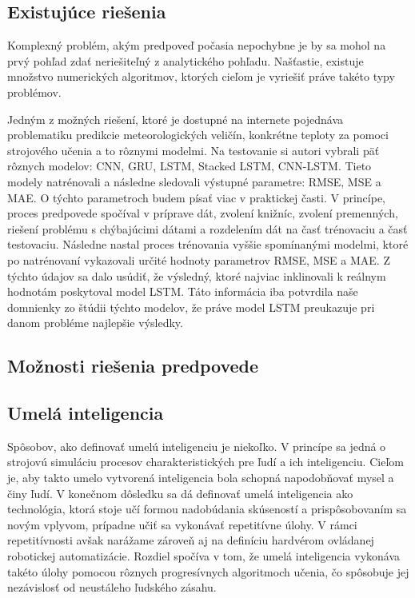 \subsection{Existujúce riešenia}
Komplexný problém, akým predpoveď počasia nepochybne je by sa mohol na prvý pohľad zdať neriešiteľný z analytického pohľadu. Našťastie, existuje množstvo numerických algoritmov, ktorých cieľom je vyriešiť práve takéto typy problémov. 

Jedným z možných riešení, ktoré je dostupné na internete pojednáva problematiku predikcie meteorologických veličín, konkrétne teploty za pomoci strojového učenia a to rôznymi modelmi. Na testovanie si autori vybrali päť rôznych modelov: CNN, GRU, LSTM, Stacked LSTM, CNN-LSTM. Tieto modely natrénovali a následne sledovali výstupné parametre: RMSE, MSE a MAE. O týchto parametroch budem písať viac v praktickej časti. V princípe, proces predpovede spočíval v príprave dát, zvolení knižníc, zvolení premenných, riešení problému s chýbajúcimi dátami a rozdelením dát na časť trénovaciu a časť testovaciu. Následne nastal proces trénovania vyššie spomínanými modelmi, ktoré po natrénovaní vykazovali určité hodnoty parametrov RMSE, MSE a MAE. Z týchto údajov sa dalo usúdiť, že výsledný, ktoré najviac inklinovali k reálnym hodnotám poskytoval model LSTM. Táto informácia iba potvrdila naše domnienky zo štúdii týchto modelov, že práve model LSTM preukazuje pri danom probléme najlepšie výsledky. 

\subsection{Možnosti riešenia predpovede}

\subsection{Umelá inteligencia}
Spôsobov, ako definovať umelú inteligenciu je niekoľko. V princípe sa jedná o strojovú simuláciu procesov charakteristických pre ľudí a ich inteligenciu. Cieľom je, aby takto umelo vytvorená inteligencia bola schopná napodobňovať mysel a činy ľudí. V konečnom dôsledku sa dá definovať umelá inteligencia ako technológia, ktorá stoje učí formou nadobúdania skúseností a prispôsobovaním sa novým vplyvom, prípadne učiť sa vykonávať repetitívne úlohy. V rámci repetitívnosti avšak narážame zároveň aj na definíciu hardvérom ovládanej robotickej automatizácie. Rozdiel spočíva v tom, že umelá inteligencia vykonáva takéto úlohy pomocou rôznych progresívnych algoritmoch učenia, čo spôsobuje jej nezávislosť od neustáleho ľudského zásahu.

